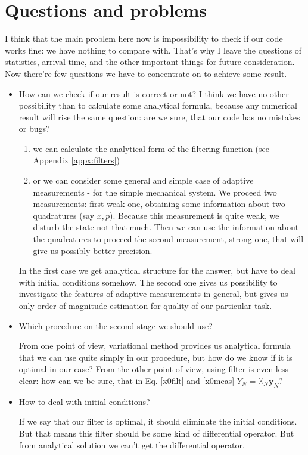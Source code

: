 \documentclass[notitlepage,a4paper,11pt,hyperref=pdftex]{revtex4-1}
\begin{document}
\section{Questions and problems}
I think that the main problem here now is impossibility to check if our code works fine: we have nothing to compare with. That's why I leave the questions of statistics, arrival time, and the other important things
for future consideration. Now there're few questions we have to concentrate on to achieve some result.

\begin{itemize}
 \item How can we check if our result is correct or not? I think we have no other possibility than to calculate some analytical formula, because any numerical result will rise the same question: 
are we sure, that our code has no mistakes or bugs?

\begin{enumerate}
 \item we can calculate the analytical form of the filtering function (see Appendix \ref{appx:filters})
 \item or we can consider some general and simple case of adaptive measurements - for the simple mechanical system. We proceed two measurements: first weak one, obtaining some information about two quadratures (say 
$x, p$). Because this measurement is quite weak, we disturb the state not that much. Then we can use the information about the quadratures to proceed the second measurement, strong one, that will give us possibly better
precision.
\end{enumerate}
In the first case we get analytical structure for the answer, but have to deal with initial conditions somehow. The second one gives us possibility to investigate the features of adaptive measurements in general,
but gives us only order of magnitude estimation for quality of our particular task.

\item Which procedure on the second stage we should use?

From one point of view, variational method provides us analytical formula that we can use quite simply in our procedure, but how do we know if it is optimal in our case?
From the other point of view, using filter is even less clear: how can we be sure, that in Eq. \ref{x0filt} and \ref{x0meas} $Y_N=\mathbb{K}_N\mathbf{y}_N$? 

\item How to deal with initial conditions?

If we say that our filter is optimal, it should eliminate the initial conditions. But that means this filter should be some kind of differential operator. But from analytical solution 
we can't get the differential operator.
\end{itemize}
\newpage
\appendix
\end{document}
